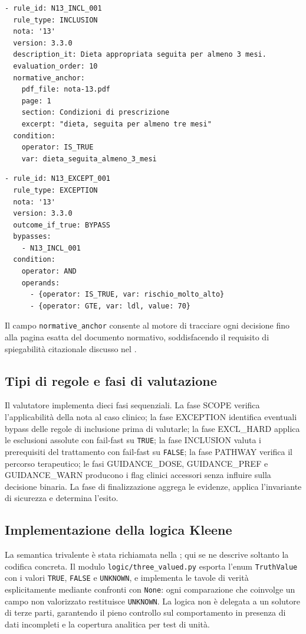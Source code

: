 \begin{verbatim}
- rule_id: N13_INCL_001
  rule_type: INCLUSION
  nota: '13'
  version: 3.3.0
  description_it: Dieta appropriata seguita per almeno 3 mesi.
  evaluation_order: 10
  normative_anchor:
    pdf_file: nota-13.pdf
    page: 1
    section: Condizioni di prescrizione
    excerpt: "dieta, seguita per almeno tre mesi"
  condition:
    operator: IS_TRUE
    var: dieta_seguita_almeno_3_mesi
\end{verbatim}

\begin{verbatim}
- rule_id: N13_EXCEPT_001
  rule_type: EXCEPTION
  nota: '13'
  version: 3.3.0
  outcome_if_true: BYPASS
  bypasses:
    - N13_INCL_001
  condition:
    operator: AND
    operands:
      - {operator: IS_TRUE, var: rischio_molto_alto}
      - {operator: GTE, var: ldl, value: 70}
\end{verbatim}

Il campo \texttt{normative\_anchor} consente al motore di tracciare ogni
decisione fino alla pagina esatta del documento normativo, soddisfacendo il
requisito di spiegabilità citazionale discusso nel .

\subsection{Tipi di regole e fasi di valutazione}

Il valutatore implementa dieci fasi sequenziali. La fase SCOPE verifica
l'applicabilità della nota al caso clinico; la fase EXCEPTION identifica
eventuali bypass delle regole di inclusione prima di valutarle; la fase
EXCL\_HARD applica le esclusioni assolute con fail-fast su \texttt{TRUE}; la
fase INCLUSION valuta i prerequisiti del trattamento con fail-fast su
\texttt{FALSE}; la fase PATHWAY verifica il percorso terapeutico; le fasi
GUIDANCE\_DOSE, GUIDANCE\_PREF e GUIDANCE\_WARN producono i flag clinici
accessori senza influire sulla decisione binaria. La fase di finalizzazione
aggrega le evidenze, applica l'invariante di sicurezza e determina l'esito.

\subsection{Implementazione della logica Kleene}

La semantica trivalente è stata richiamata nella ;
qui se ne descrive soltanto la codifica concreta. Il modulo
\texttt{logic/three\_valued.py} esporta l'enum \texttt{TruthValue} con i
valori \texttt{TRUE}, \texttt{FALSE} e \texttt{UNKNOWN}, e implementa le
tavole di verità esplicitamente mediante confronti con \texttt{None}: ogni
comparazione che coinvolge un campo non valorizzato restituisce
\texttt{UNKNOWN}. La logica non è delegata a un solutore di terze parti,
garantendo il pieno controllo sul comportamento in presenza di dati
incompleti e la copertura analitica per test di unità.

